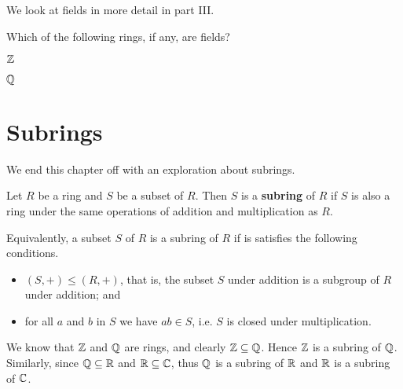 We look at fields in more detail in part III.

\begin{exercise}
    Which of the following rings, if any, are fields?
    \begin{partquestions}{\alph*}
        \item $\mathbb{Z}$
        \item $\mathbb{Q}$
    \end{partquestions}
\end{exercise}

\section{Subrings}
We end this chapter off with an exploration about subrings.

\begin{definition}
    Let $R$ be a ring and $S$ be a subset of $R$. Then $S$ is a \textbf{subring} of $R$ if $S$ is also a ring under the same operations of addition and multiplication as $R$.
\end{definition}
\begin{remark}
    Equivalently, a subset $S$ of $R$ is a subring of $R$ if is satisfies the following conditions.
    \begin{itemize}
        \item $(S, +) \leq (R, +)$, that is, the subset $S$ under addition is a subgroup of $R$ under addition; and
        \item for all $a$ and $b$ in $S$ we have $ab \in S$, i.e. $S$ is closed under multiplication.
    \end{itemize}
\end{remark}

\begin{example}
    We know that $\mathbb{Z}$ and $\mathbb{Q}$ are rings, and clearly $\mathbb{Z} \subseteq \mathbb{Q}$. Hence $\mathbb{Z}$ is a subring of $\mathbb{Q}$. Similarly, since $\mathbb{Q} \subseteq \mathbb{R}$ and $\mathbb{R} \subseteq \mathbb{C}$, thus $\mathbb{Q}$ is a subring of $\mathbb{R}$ and $\mathbb{R}$ is a subring of $\mathbb{C}$.
\end{example}

